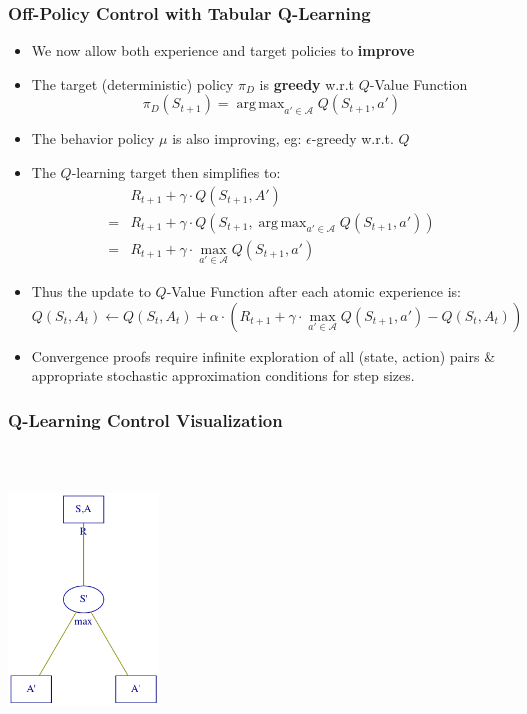 \documentclass[handout]{beamer}
\DeclareMathOperator*{\argmax}{arg\,max}
\begin{document}
\begin{frame}
\frametitle{Off-Policy Control with Tabular Q-Learning}
\pause
\begin{itemize}[<+->]
\item We now allow both experience and target policies to {\bf improve}
\item The target (deterministic) policy $\pi_D$ is {\bf greedy} w.r.t $Q$-Value Function
$$\pi_D(S_{t+1}) = \argmax_{a' \in \mathcal{A}} Q(S_{t+1}, a')$$
\item The behavior policy $\mu$ is also improving, eg: $\epsilon$-greedy w.r.t. $Q$
\item The $Q$-learning target then simplifies to:
\begin{align*}
& R_{t+1} + \gamma \cdot Q(S_{t+1}, A') \\
= & R_{t+1} + \gamma \cdot Q(S_{t+1}, \argmax_{a' \in \mathcal{A}} Q(S_{t+1}, a')) \\
= & R_{t+1} + \gamma \cdot \max_{a' \in \mathcal{A}} Q(S_{t+1}, a')
\end{align*}
\item Thus the update to $Q$-Value Function after each atomic experience is:
$$Q(S_t, A_t) \leftarrow Q(S_t, A_t) + \alpha \cdot (R_{t+1} + \gamma \cdot \max_{a' \in \mathcal{A}} Q(S_{t+1}, a') - Q(S_t, A_t))$$
\item Convergence proofs require infinite exploration of all (state, action) pairs \& appropriate stochastic approximation conditions for step sizes.
\end{itemize}
\end{frame}


\begin{frame}
\frametitle{Q-Learning Control Visualization}
\centerline{\includegraphics[width=4cm, height=8cm]{q_learning.png}}
\end{frame}
\end{document}
